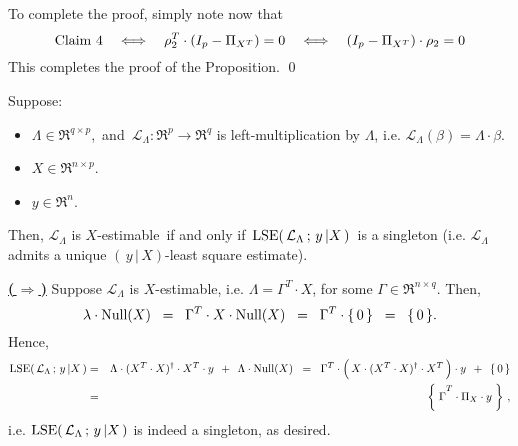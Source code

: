 \vskip 0.5cm
\noindent
To complete the proof, simply note now that
\begin{equation*}
\textnormal{Claim 4}
\quad\Longleftrightarrow\quad
	\rho_{2}^{T} \cdot (I_{p} - \Pi_{X^{T}}) = 0
\quad\Longleftrightarrow\quad
	(I_{p} - \Pi_{X^{T}}) \cdot \rho_{2} = 0
\end{equation*}
This completes the proof of the Proposition.
\qed

\begin{theorem}
\label{MatrixEstimabilityImpliesUniqueLSE}
\mbox{}\vskip 0.1cm\noindent
Suppose:
\begin{itemize}
\item
	$\Lambda \in \Re^{q \times p}$,\,
	and
	\,$\mathcal{L}_{\Lambda} : \Re^{p} \longrightarrow \Re^{q}$ is left-multiplication by $\Lambda$,
	i.e. $\mathcal{L}_{\Lambda}(\beta) = \Lambda \cdot \beta$.
\item
	$X \in \Re^{n \times p}$.
\item
	$y \in \Re^{n}$.
\end{itemize}
Then,
	$\mathcal{L}_{\Lambda}$ is $X$-estimable
	\,if and only if\,
	$\textnormal{LSE}\!\left(\,\mathcal{L}_{\Lambda} \,;\, y\,\vert X\,\right)$\,
	is a singleton (i.e. $\mathcal{L}_{\Lambda}$ admits a unique $(\,y\,\vert\,X)$-least square estimate).
\end{theorem}
\proof
\vskip 0.2cm\noindent
\underline{\textbf{(\,$\Longrightarrow$\,)}}\quad
Suppose $\mathcal{L}_{\Lambda}$ is $X$-estimable, i.e. $\Lambda = \Gamma^{T} \cdot X$,
for some $\Gamma \in \Re^{n \times q}$.
Then,
\begin{equation*}
\lambda\cdot\textnormal{Null}(X) \;\;=\;\; \Gamma^{T} \cdot X \cdot \textnormal{Null}(X) \;\;=\;\; \Gamma^{T} \cdot \{\,0\,\} \;\;=\;\; \{\,0\,\}.
\end{equation*}
Hence,
\begin{eqnarray*}
\lse\!\left(\,\mathcal{L}_{\Lambda} \,;\, y\,\vert X\,\right)
&=&
	\Lambda \cdot (X^{T} \cdot X)^{\dagger} \cdot X^{T} \cdot y \;\, + \;\, \Lambda \cdot \Null(X)
\;\;=\;\;
	\Gamma^{T} \cdot \left(\,\overset{{\color{white}.}}{X} \cdot (X^{T} \cdot X)^{\dagger} \cdot X^{T}\,\right) \cdot y \;\, + \;\, \{\,0\,\}
\\
&=&
	\left\{\; \overset{{\color{white}.}}{\Gamma}^{T} \cdot \Pi_{X} \cdot y \;\right\}\,,
\end{eqnarray*}
i.e. $\textnormal{LSE}\!\left(\,\mathcal{L}_{\Lambda} \,;\, y\,\vert X\,\right)$ is indeed a singleton, as desired.

